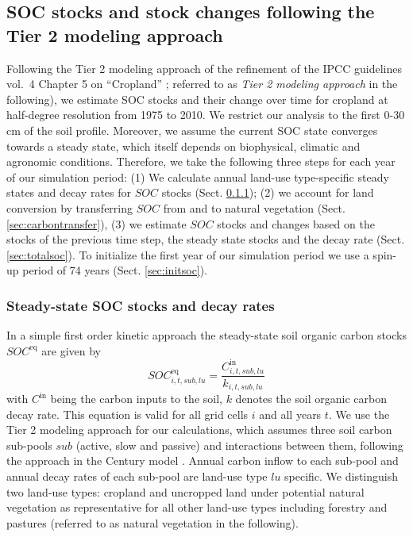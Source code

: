 \documentclass[gc, manuscript]{copernicus}
\begin{document}
\hypertarget{sec:carbonbudget}{%
\subsection{SOC stocks and stock changes following the Tier 2 modeling approach}\label{sec:carbonbudget}}

Following the Tier 2 modeling approach of the refinement of the IPCC guidelines vol.~4 Chapter 5 on ``Cropland'' \citep{ogle_cropland_in_ipcc_2019}; referred to as \textit{Tier 2 modeling approach} in the following), we estimate SOC stocks and their change over time for cropland at half-degree resolution from 1975 to 2010. We restrict our analysis to the first 0-30 cm of the soil profile. Moreover, we assume the current SOC state converges towards a steady state, which itself depends on biophysical, climatic and agronomic conditions.
Therefore, we take the following three steps for each year of our simulation period:
(1) We calculate annual land-use type-specific steady states and decay rates for \(SOC\) stocks (Sect. \ref{sec:steadystates});
(2) we account for land conversion by transferring \(SOC\) from and to natural vegetation (Sect. \ref{sec:carbontransfer}),
(3) we estimate \(SOC\) stocks and changes based on the stocks of the previous time step, the steady state stocks and the decay rate (Sect. \ref{sec:totalsoc}).
To initialize the first year of our simulation period we use a spin-up period of 74 years (Sect. \ref{sec:initsoc}).

\hypertarget{sec:steadystates}{%
\subsubsection{Steady-state SOC stocks and decay rates}\label{sec:steadystates}}

In a simple first order kinetic approach the steady-state soil organic carbon stocks \(SOC^{\mathrm{eq}}\) are given by
\begin{equation}
SOC^{\mathrm{eq}}_{i,t,sub,lu} =\frac{C^{\mathrm{in}}_{i,t,sub,lu}}{k_{i,t,sub,lu}}
\label{eq:inoutflow}
\end{equation}
with \(C^{\textrm{in}}\) being the carbon inputs to the soil, \(k\) denotes the soil organic carbon decay rate. This equation is valid for all grid cells \(i\) and all years \(t\). We use the Tier 2 modeling approach for our calculations, which assumes three soil carbon sub-pools \(sub\) (active, slow and passive) and interactions between them, following the approach in the Century model \citep{parton_analysis_1987}. Annual carbon inflow to each sub-pool and annual decay rates of each sub-pool are land-use type \(lu\) specific.
We distinguish two land-use types: cropland and uncropped land under potential natural vegetation as representative for all other land-use types including forestry and pastures (referred to as natural vegetation in the following).
\end{document}

